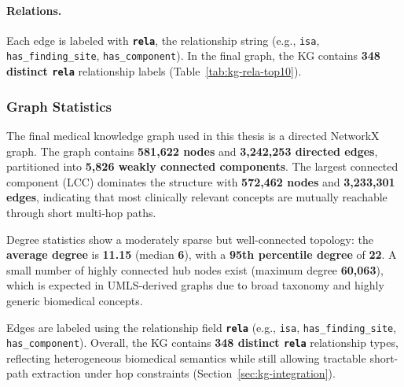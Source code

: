 \paragraph{Relations.}
Each edge is labeled with \textbf{\texttt{rela}}, the relationship string (e.g., \texttt{isa}, \texttt{has\_finding\_site}, \texttt{has\_component}). In the final graph, the KG contains \textbf{348 distinct \texttt{rela}} relationship labels (Table~\ref{tab:kg-rela-top10}).

\subsubsection{Graph Statistics}
\label{subsubsec:kg-stats}

The final medical knowledge graph used in this thesis is a directed NetworkX graph. The graph contains \textbf{581,622 nodes} and \textbf{3,242,253 directed edges}, partitioned into \textbf{5,826 weakly connected components}. The largest connected component (LCC) dominates the structure with \textbf{572,462 nodes} and \textbf{3,233,301 edges}, indicating that most clinically relevant concepts are mutually reachable through short multi-hop paths.

Degree statistics show a moderately sparse but well-connected topology: the \textbf{average degree} is \textbf{11.15} (median \textbf{6}), with a \textbf{95th percentile degree} of \textbf{22}. A small number of highly connected hub nodes exist (maximum degree \textbf{60,063}), which is expected in UMLS-derived graphs due to broad taxonomy and highly generic biomedical concepts.

Edges are labeled using the relationship field \textbf{\texttt{rela}} (e.g., \texttt{isa}, \texttt{has\_finding\_site}, \texttt{has\_component}). Overall, the KG contains \textbf{348 distinct \texttt{rela}} relationship types, reflecting heterogeneous biomedical semantics while still allowing tractable short-path extraction under hop constraints (Section~\ref{sec:kg-integration}).


